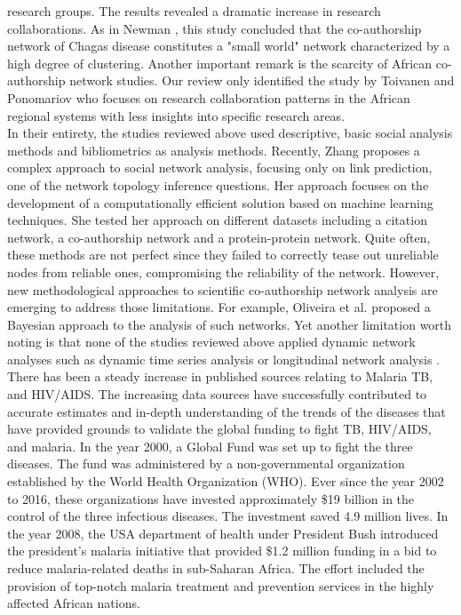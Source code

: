 research groups. The results revealed a dramatic increase in research collaborations. As in Newman \cite{newman_structure_2001}, this study concluded that the co-authorship network of Chagas disease constitutes a "small world" network characterized by a high degree of clustering. Another important remark is the scarcity of African co-authorship network studies. Our review only identified the study by Toivanen and Ponomariov \cite{toivanen_african_2011} who focuses on research collaboration patterns in the African regional systems with less insights into specific research areas.\\
In their entirety, the studies reviewed above used descriptive, basic social analysis methods and bibliometrics as analysis methods. Recently, Zhang \cite{zhang_complex_2014} proposes a complex approach to social network analysis, focusing only on link prediction, one of the network topology inference questions. Her approach focuses on the development of a computationally efficient solution based on machine learning techniques. She tested her approach on different datasets including a citation network, a co-authorship network and a protein-protein network. Quite often, these methods are not perfect since they failed to correctly tease out unreliable nodes from reliable ones, compromising the reliability of the network. However, new methodological approaches to scientific co-authorship network analysis are emerging to address those limitations. For example, Oliveira et al. \cite{oliveira_bayesian_2017} proposed a Bayesian approach to the analysis of such networks. Yet another limitation worth noting is that none of the studies reviewed above applied dynamic network analyses such as dynamic time series analysis or longitudinal network analysis \cite{mali_dynamic_2012}.\\
There has been a steady increase in published sources relating to Malaria TB, and HIV/AIDS. The increasing data sources have successfully contributed to accurate estimates and in-depth understanding of the trends of the diseases that have provided grounds to validate the global funding to fight TB, HIV/AIDS, and malaria. In the year 2000, a Global Fund was set up to fight the three diseases. The fund was administered by a non-governmental organization established by the World Health Organization (WHO). Ever since the year 2002 to 2016, these organizations have invested approximately \$19 billion in the control of the three infectious diseases. The investment saved 4.9 million lives. In the year 2008, the USA department of health under President Bush introduced the president’s malaria initiative \cite{stoops_presidents_2008} that provided \$1.2 million funding in a bid to reduce malaria-related deaths in sub-Saharan Africa. The effort included the provision of top-notch malaria treatment and prevention services in the highly affected African nations.

